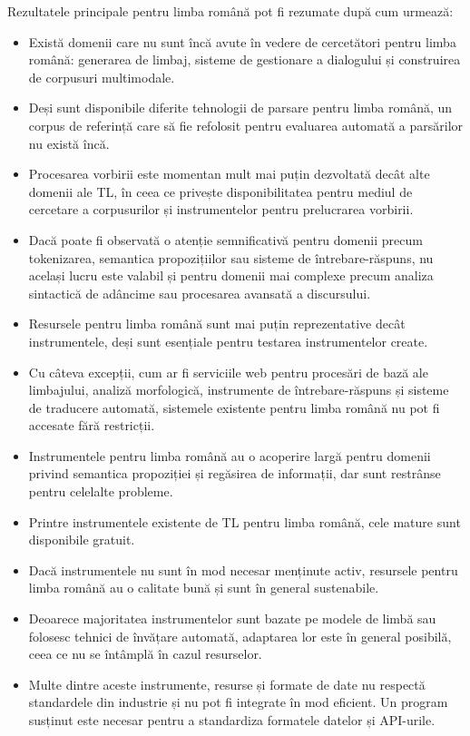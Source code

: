 \begin{multicols}{2}
Rezultatele principale pentru limba română pot fi rezumate după cum urmează:

\begin{itemize}
\item Există domenii care nu sunt încă avute în vedere de cercetători pentru limba română: generarea de limbaj, sisteme de gestionare a dialogului și construirea de corpusuri multimodale.
\item Deși sunt disponibile diferite tehnologii de parsare pentru limba română, un corpus de referință care să fie refolosit pentru evaluarea automată a parsărilor nu există încă.
\item Procesarea vorbirii este momentan mult mai puțin dezvoltată decât alte domenii ale TL, în ceea ce privește disponibilitatea pentru mediul de cercetare a corpusurilor și instrumentelor pentru prelucrarea vorbirii.
\item Dacă poate fi observată o atenție semnificativă pentru domenii precum tokenizarea, semantica propozițiilor sau sisteme de întrebare-răspuns, nu același lucru este valabil și pentru domenii mai complexe precum analiza sintactică de adâncime sau procesarea avansată a discursului.
\item Resursele pentru limba română sunt mai puțin reprezentative decât instrumentele, deși sunt esențiale pentru testarea instrumentelor create. 
\item Cu câteva excepții, cum ar fi serviciile web pentru procesări de bază ale limbajului, analiză morfologică, instrumente de întrebare-răspuns și sisteme de traducere automată, sistemele existente pentru limba română nu pot fi accesate fără restricții. 
\item Instrumentele pentru limba română au o acoperire largă pentru domenii privind semantica propoziției și regăsirea de informații, dar sunt restrânse pentru celelalte probleme.
\item Printre instrumentele existente de TL pentru limba română, cele mature sunt disponibile gratuit.
\item Dacă instrumentele nu sunt în mod necesar menținute activ, resursele pentru limba română au o calitate bună și sunt în general sustenabile.
\item Deoarece majoritatea instrumentelor sunt bazate pe modele de limbă sau folosesc tehnici de învățare automată, adaptarea lor este în general posibilă, ceea ce nu se întâmplă în cazul resurselor.
\item Multe dintre aceste instrumente, resurse și formate de date nu respectă standardele din industrie și nu pot fi integrate în mod eficient. Un program susținut este necesar pentru a standardiza formatele datelor și API-urile.

\end{itemize}
\end{multicols}
